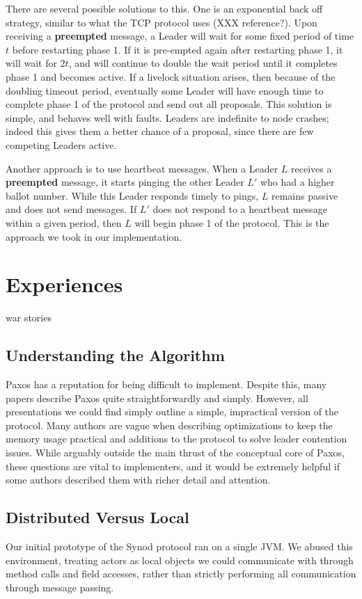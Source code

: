 \documentclass{sig-alternate}
\begin{document}
There are several possible solutions to this. One is an exponential back off strategy, similar to what the TCP protocol uses (XXX reference?). Upon receiving a \textbf{preempted} message, a Leader will wait for some fixed period of time $t$ before restarting phase 1. If it is pre-empted again after restarting phase 1, it will wait for $2t$, and will continue to double the wait period until it completes phase 1 and becomes active. If a livelock situation arises, then because of the doubling timeout period, eventually some Leader will have enough time to complete phase 1 of the protocol and send out all proposals. This solution is simple, and behaves well with faults. Leaders are indefinite to node crashes; indeed this gives them a better chance of a proposal, since there are few competing Leaders active.

Another approach is to use heartbeat messages. When a Leader $L$ receives a \textbf{preempted} message, it starts pinging the other Leader $L'$ who had a higher ballot number. While this Leader responds timely to pings, $L$ remains passive and does not send messages. If $L'$ does not respond to a heartbeat message within a given period, then $L$ will begin phase 1 of the protocol. This is the approach we took in our implementation.

\section{Experiences}
war stories

\subsection{Understanding the Algorithm}

Paxos has a reputation for being difficult to implement. Despite this, many papers describe Paxos quite straightforwardly and simply. However, all presentations we could find simply outline a simple, impractical version of the protocol. Many authors are vague when describing optimizations to keep the memory usage practical and additions to the protocol to solve leader contention issues. While arguably outside the main thrust of the conceptual core of Paxos, these questions are vital to implementers, and it would be extremely helpful if some authors described them with richer detail and attention.

\subsection{Distributed Versus Local}
Our initial prototype of the Synod protocol ran on a single JVM. We abused this environment, treating actors as local objects we could communicate with through method calls and field accesses, rather than strictly performing all communication through message passing.
\end{document}
